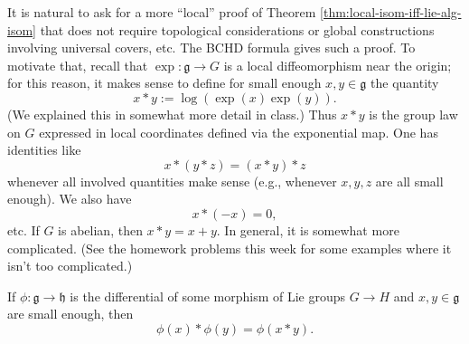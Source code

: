 \documentclass[reqno]{amsart} 
\begin{document}
It is natural to ask for a more ``local'' proof of Theorem \ref{thm:local-isom-iff-lie-alg-isom} that does not require topological considerations or global constructions involving universal covers, etc.  The BCHD formula gives such a proof.  To motivate that, recall that $\exp : \mathfrak{g} \rightarrow G$ is a local diffeomorphism near the origin; for this reason, it makes sense to define for small enough $x,y \in \mathfrak{g}$ the quantity
\begin{equation*}
  x \ast y := \log(\exp(x) \exp(y)).
\end{equation*}
(We explained this in somewhat more detail in class.)  Thus $x \ast y$ is the group law on $G$ expressed in local coordinates defined via the exponential map.  One has identities like
\begin{equation*}
  x \ast (y \ast z) = (x \ast y) \ast z
\end{equation*}
whenever all involved quantities make sense (e.g., whenever $x,y,z$ are all small enough).  We also have
\begin{equation*}
  x \ast (-x) = 0,
\end{equation*}
etc.  If $G$ is abelian, then $x \ast y = x + y$.  In general, it is somewhat more complicated.  (See the homework problems this week for some examples where it isn't too complicated.)
\begin{exercise}\label{exercise:star-product-commutes-with-differentials-of-morphisms}
  If $\phi : \mathfrak{g} \rightarrow \mathfrak{h}$ is the differential of some morphism of Lie groups $G \rightarrow H$ and $x,y \in \mathfrak{g}$ are small enough, then
  \begin{equation*}
    \phi(x) \ast \phi(y) = \phi(x \ast y).
  \end{equation*}
\end{exercise}
\end{document}
